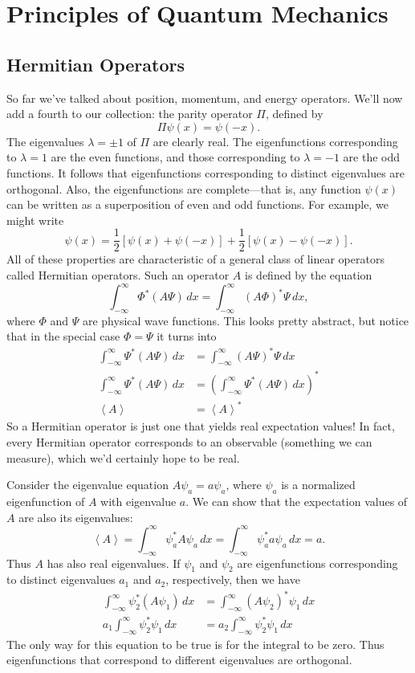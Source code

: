 \documentclass[../p052main.tex]{subfiles}
\begin{document}
\chapter{Principles of Quantum Mechanics}
\section{Hermitian Operators}
So far we've talked about position, momentum, and energy operators.
We'll now add a fourth to our collection: the parity operator $\Pi$, defined by
\[ \Pi \psi(x) = \psi(-x). \]
The eigenvalues $\lambda = \pm 1$ of $\Pi$ are clearly real.
The eigenfunctions corresponding to $\lambda = 1$ are the even functions, and those corresponding to $\lambda = -1$ are the odd functions.
It follows that eigenfunctions corresponding to distinct eigenvalues are orthogonal.
Also, the eigenfunctions are complete---that is, any function $\psi(x)$ can be written as a superposition of even and odd functions.
For example, we might write
\[ \psi (x) = \frac{1}{2} \left[ \psi(x) + \psi(-x) \right] + \frac{1}{2} \left[ \psi(x) - \psi(-x) \right]. \]
All of these properties are characteristic of a general class of linear operators called Hermitian operators.
Such an operator $A$ is defined by the equation
\[ \int_{-\infty}^{\infty} \Phi^* \left( A \Psi \right) \,dx = \int_{-\infty}^{\infty} \left( A \Phi \right)^* \Psi \,dx, \]
where $\Phi$ and $\Psi$ are physical wave functions.
This looks pretty abstract, but notice that in the special case $\Phi = \Psi$ it turns into
\begin{align*}
    \int_{-\infty}^{\infty} \Psi^* \left( A \Psi \right) \,dx &= \int_{-\infty}^{\infty} \left( A \Psi \right)^* \Psi \,dx \\
    \int_{-\infty}^{\infty} \Psi^* \left( A \Psi \right) \,dx &= \left( \int_{-\infty}^{\infty} \Psi^* \left( A \Psi \right) \,dx \right)^* \\
    \left< A \right> &= \left< A \right>^*
\end{align*}
So a Hermitian operator is just one that yields real expectation values!
In fact, every Hermitian operator corresponds to an observable (something we can measure), which we'd certainly hope to be real.

Consider the eigenvalue equation $A \psi_a = a \psi_a$, where $\psi_a$ is a normalized eigenfunction of $A$ with eigenvalue $a$.
We can show that the expectation values of $A$ are also its eigenvalues:
\[ \left< A \right> = \int_{-\infty}^{\infty} \psi_a^* A \psi_a \,dx = \int_{-\infty}^{\infty} \psi_a^* a \psi_a \,dx = a. \]
Thus $A$ has also real eigenvalues.
If $\psi_1$ and $\psi_2$ are eigenfunctions corresponding to distinct eigenvalues $a_1$ and $a_2$, respectively, then we have
\begin{align*}
    \int_{-\infty}^{\infty} \psi_2^* (A \psi_1) \,dx &= \int_{-\infty}^{\infty} (A \psi_2)^* \psi_1 \,dx \\
    a_1 \int_{-\infty}^{\infty} \psi_2^* \psi_1 \,dx &= a_2 \int_{-\infty}^{\infty} \psi_2^* \psi_1 \,dx
\end{align*}
The only way for this equation to be true is for the integral to be zero.
Thus eigenfunctions that correspond to different eigenvalues are orthogonal.
\end{document}
